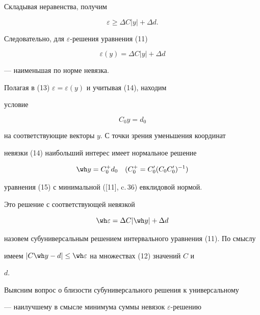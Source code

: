 Складывая неравенства, получим 


$$ 


\varepsilon\ge\Delta C|y|+\Delta d. 


$$ 


Следовательно, для $\varepsilon$-решения уравнения (11) 


\begin{equation} 


\varepsilon(y)=\Delta C|y|+\Delta d 


\end{equation} 


--- наименьшая по норме невязка. 


Полагая в (13)\; $\varepsilon=\varepsilon(y)$ и учитывая (14), находим 


условие 


\begin{equation} 


C_0y=d_0 


\end{equation} 


на соответствующие векторы $y$. С точки зрения уменьшения координат 


невязки (14) наибольший интерес имеет нормальное решение 


\begin{equation} 


\wh y=C^+_0d_0\quad (C^+_0=C'_0(C_0C'_0)^{-1}) 


\end{equation} 


уравнения (15) с минимальной ([11], c.\,36) евклидовой нормой. 


Это решение с соответствующей невязкой 


\begin{equation} 


\wh\varepsilon=\Delta C|\wh y|+\Delta d 


\end{equation} 


назовем субуниверсальным решением интервального уравнения (11). По смыслу 


имеем $|C\wh y-d|\le\wh\varepsilon$ на множествах (12) значений $C$ и 


$d$. 


 


Выясним вопрос о близости субуниверсального решения к универсальному 


--- наилучшему в смысле минимума суммы невязок $\varepsilon$-решению 


